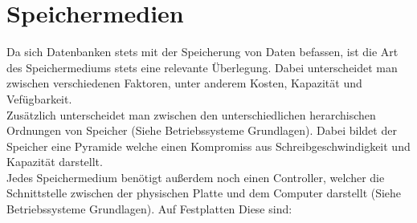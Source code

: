 \documentclass{article}
\begin{document}
	\section{Speichermedien}
	Da sich Datenbanken stets mit der Speicherung von Daten befassen, ist die Art des Speichermediums stets eine relevante Überlegung. Dabei unterscheidet man zwischen verschiedenen Faktoren, unter anderem Kosten, Kapazität und Vefügbarkeit. \\
	Zusätzlich unterscheidet man zwischen den unterschiedlichen herarchischen Ordnungen von Speicher (Siehe Betriebssysteme Grundlagen). Dabei bildet der Speicher eine Pyramide welche einen Kompromiss aus Schreibgeschwindigkeit und Kapazität darstellt. \\
	Jedes Speichermedium benötigt außerdem noch einen Controller, welcher die Schnittstelle zwischen der physischen Platte und dem Computer darstellt (Siehe Betriebssysteme Grundlagen). Auf Festplatten
	Diese sind:
\end{document}
